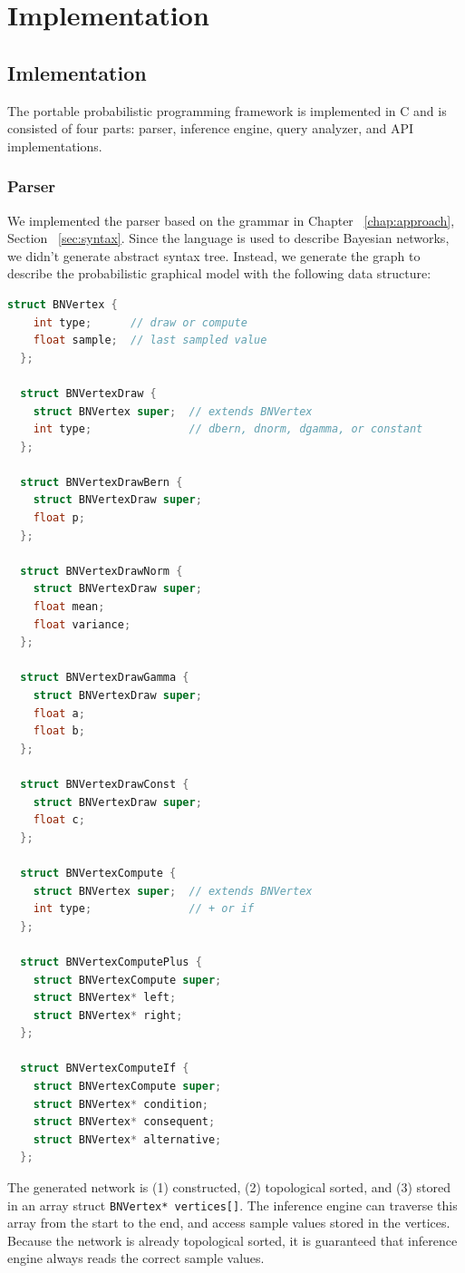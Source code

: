 \chapter{Implementation}
\label{chap:eval}
\section{Imlementation}
The portable probabilistic programming framework is implemented in C and is consisted of four parts: parser, inference engine, query analyzer, and API implementations.

\subsection{Parser}
We implemented the parser based on the grammar in Chapter ~\ref{chap:approach}, Section ~\ref{sec:syntax}. Since the language is used to describe Bayesian networks, we didn't generate abstract syntax tree. Instead, we generate the graph to describe the probabilistic graphical model with the following data structure:
\begin{lstlisting}[language=C]
  struct BNVertex {
    int type;      // draw or compute
    float sample;  // last sampled value
  };
 
  struct BNVertexDraw {
    struct BNVertex super;  // extends BNVertex
    int type;               // dbern, dnorm, dgamma, or constant
  };
 
  struct BNVertexDrawBern {
    struct BNVertexDraw super;
    float p;
  };
 
  struct BNVertexDrawNorm {
    struct BNVertexDraw super;
    float mean;
    float variance;
  };
 
  struct BNVertexDrawGamma {
    struct BNVertexDraw super;
    float a;
    float b;
  };
 
  struct BNVertexDrawConst {
    struct BNVertexDraw super;
    float c;
  };
 
  struct BNVertexCompute {
    struct BNVertex super;  // extends BNVertex
    int type;               // + or if
  };
 
  struct BNVertexComputePlus {
    struct BNVertexCompute super;
    struct BNVertex* left;
    struct BNVertex* right;
  };
 
  struct BNVertexComputeIf {
    struct BNVertexCompute super;
    struct BNVertex* condition;
    struct BNVertex* consequent;
    struct BNVertex* alternative;
  };
\end{lstlisting}
The generated network is (1) constructed, (2) topological sorted, and (3) stored in an array struct \texttt{BNVertex* vertices[]}. The inference engine can traverse this array from the start to the end, and access sample values stored in the vertices. Because the network is already topological sorted, it is guaranteed that inference engine always reads the correct sample values.

